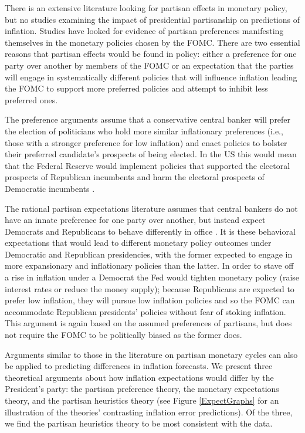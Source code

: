 \documentclass[a4paper]{article}\usepackage{graphicx, color}
\begin{document}
There is an extensive literature looking for partisan effects in monetary policy, but no studies examining the impact of presidential partisanship on predictions of inflation. Studies have looked for evidence of partisan preferences manifesting themselves in the monetary policies chosen by the FOMC. There are two essential reasons that partisan effects would be found in policy: either a preference for one party over another by members of the FOMC or an expectation that the parties will engage in systematically different policies that will influence inflation leading the FOMC to support more preferred policies and attempt to inhibit less preferred ones. 

The preference arguments assume that a conservative central banker will prefer the election of politicians who hold more similar inflationary preferences (i.e., those with a stronger preference for low inflation) and enact policies to bolster their preferred candidate's prospects of being elected. In the US this would mean that the Federal Reserve would implement policies that supported the electoral prospects of Republican incumbents and harm the electoral prospects of Democratic incumbents \citep{Clark2012,Hakes1988,Sieg1997,Tootell1996}.

The rational partisan expectations literature assumes that central bankers do not have an innate preference for one party over another, but instead expect Democrats and Republicans to behave differently in office \citep{Alesina1991,Hibbs1994}. It is these behavioral expectations that would lead to different monetary policy outcomes under Democratic and Republican presidencies, with the former expected to engage in more expansionary and inflationary policies than the latter. In order to stave off a rise in inflation under a Democrat the Fed would tighten monetary policy (raise interest rates or reduce the money supply); because Republicans are expected to prefer low inflation, they will pursue low inflation policies and so the FOMC can accommodate Republican presidents' policies without fear of stoking inflation. This argument is again based on the assumed preferences of partisans, but does not require the FOMC to be politically biased as the former does. 

Arguments similar to those in the literature on partisan monetary cycles can also be applied to predicting differences in inflation forecasts. We present three theoretical arguments about how inflation expectations would differ by the President's party: the partisan preference theory, the monetary expectations theory, and the partisan heuristics theory (see Figure \ref{ExpectGraphs} for an illustration of the theories' contrasting inflation error predictions). Of the three, we find the partisan heuristics theory to be most consistent with the data.
\end{document}
